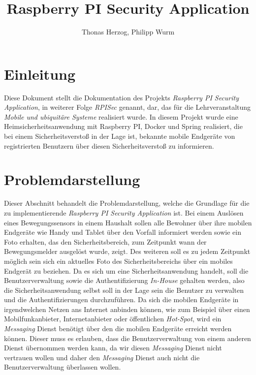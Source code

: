 \documentclass[]{article}
\title{Raspberry PI Security Application}
\author{Thonas Herzog, Philipp Wurm}
\begin{document}
\maketitle

\begin{abstract}
\end{abstract}

\section{Einleitung}
Diese Dokument stellt die Dokumentation des Projekts \emph{Raspberry PI Security Application}, in weiterer Folge \emph{RPISec} genannt, dar, das für die Lehrveranstaltung \emph{Mobile und ubiquitäre Systeme} realisiert wurde. In diesem Projekt wurde eine Heimsicherheitsanwendung mit Raspberry PI, Docker und Spring realisiert, die bei einem Sicherheitsverstoß in der Lage ist, bekannte mobile Endgeräte von registrierten Benutzern über diesen Sicherheitsverstoß zu informieren. 

\section{Problemdarstellung}
Dieser Abschnitt behandelt die Problemdarstellung, welche die Grundlage für die zu implementierende \emph{Raspberry PI Security Application} ist. Bei einem Auslösen eines Bewegungssensors in einem Haushalt sollen alle Bewohner über ihre mobilen Endgeräte wie Handy und Tablet über den Vorfall informiert werden sowie ein Foto erhalten, das den Sicherheitsbereich, zum Zeitpunkt wann der Bewegungsmelder ausgelöst wurde, zeigt. Des weiteren soll es zu jedem Zeitpunkt möglich sein sich ein aktuelles Foto des Sicherheitsbereichs über ein mobiles Endgerät zu beziehen.  
\newline
\newline
Da es sich um eine Sicherheitsanwendung handelt, soll die Benutzerverwaltung sowie die Authentifizierung \emph{In-House} gehalten werden, also die Sicherheitsanwendung selbst soll in der Lage sein die Benutzer zu verwalten und die Authentifizierungen durchzuführen. Da sich die mobilen Endgeräte in irgendwelchen Netzen ans Internet anbinden können, wie zum Beispiel über einen Mobilfunkanbieter, Internetanbieter oder öffentlichen \emph{Hot-Spot}, wird ein \emph{Messaging} Dienst benötigt über den die mobilen Endgeräte erreicht werden können. Dieser muss es erlauben, dass die Benutzerverwaltung von einem anderen Dienst übernommen werden kann, da wir diesen \emph{Messaging} Dienst nicht vertrauen wollen und daher den \emph{Messaging} Dienst auch nicht die Benutzerverwaltung überlassen wollen.
\newpage
\end{document}
